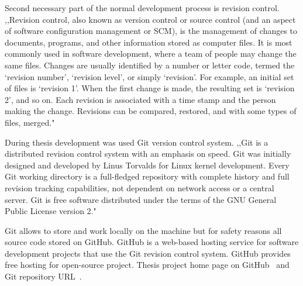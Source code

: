 Second necessary part of the normal development process is revision control. ,,Revision control, also known as version control or source control (and an aspect of software configuration management or SCM), is the management of changes to documents, programs, and other information stored as computer files. It is most commonly used in software development, where a team of people may change the same files. Changes are usually identified by a number or letter code, termed the `revision number', `revision level', or simply `revision'. For example, an initial set of files is `revision 1'. When the first change is made, the resulting set is `revision 2', and so on. Each revision is associated with a time stamp and the person making the change. Revisions can be compared, restored, and with some types of files, merged."~\cite{REVISION_CONTROL}


During thesis development was used Git version control system. ,,Git is a distributed revision control system with an emphasis on speed. Git was initially designed and developed by Linus Torvalds for Linux kernel development. Every Git working directory is a full-fledged repository with complete history and full revision tracking capabilities, not dependent on network access or a central server. Git is free software distributed under the terms of the GNU General Public License version 2."~\cite{GIT} 


Git allows to store and work locally on the machine but for safety reasons all source code stored on GitHub. GitHub is a web-based hosting service for software development projects that use the Git revision control system. GitHub provides free hosting for open-source project. Thesis project home page on GitHub~\cite{GitHub_homepage} and Git repository URL~\cite{GitHub_repository}.

